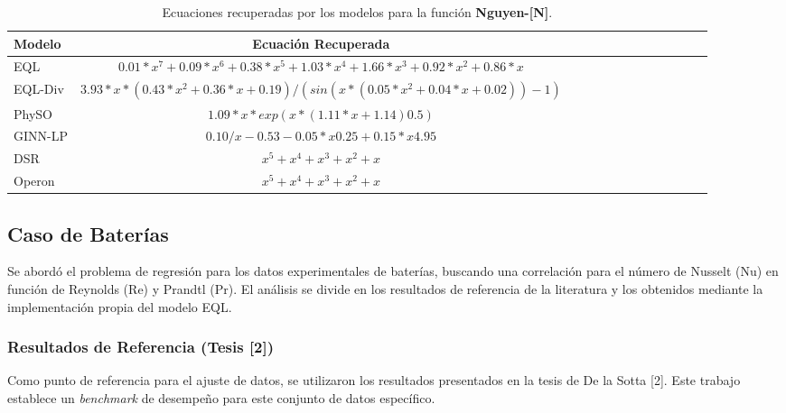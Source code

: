 \begin{table}[H]
    \centering
    \caption{Ecuaciones recuperadas por los modelos para la función \textbf{Nguyen-[N]}.}
    \begin{tabular}{lcccccccccccc}
        \hline
        \textbf{Modelo} & \textbf{Ecuación Recuperada} \\ \hline

        EQL & $0.01*x^7 + 0.09*x^6 + 0.38*x^5 + 1.03*x^4 + 1.66*x^3 + 0.92*x^2 + 0.86*x$ \\ \hline

        EQL-Div & $3.93*x*(0.43*x^2+ 0.36*x + 0.19)/(sin(x*(0.05*x^2 + 0.04*x + 0.02)) - 1)$ \\ \hline

        PhySO & $1.09*x*exp(x*(1.11*x + 1.14)0.5)$ \\ \hline

        GINN-LP & $0.10/x-0.53 - 0.05*x0.25 + 0.15*x4.95$ \\ \hline

        DSR & $x^5 + x^4 + x^3 + x^2 + x$ \\ \hline

        Operon & $x^5 + x^4 + x^3 + x^2 + x$ \\ \hline

    \end{tabular}
\end{table}


\subsection{Caso de Baterías}


Se abordó el problema de regresión para los datos experimentales de baterías, buscando una correlación para el número de Nusselt ($\text{Nu}$) en función de Reynolds ($\text{Re}$) y Prandtl ($\text{Pr}$). El análisis se divide en los resultados de referencia de la literatura y los obtenidos mediante la implementación propia del modelo EQL.

\subsubsection{Resultados de Referencia (Tesis [2])}

Como punto de referencia para el ajuste de datos, se utilizaron los resultados presentados en la tesis de De la Sotta [2]. Este trabajo establece un \textit{benchmark} de desempeño para este conjunto de datos específico.

